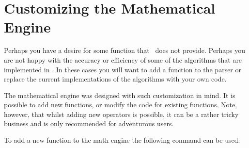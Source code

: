 %
%
%


\section{Customizing the Mathematical Engine}
\label{pgfmath-reimplement}

Perhaps you have a desire for some function that \pgfname\ does not provide.
Perhaps you are not happy with the accuracy or efficiency of some of the
algorithms that are implemented in \pgfname. In these cases you will want to
add a function to the parser or replace the current implementations of the
algorithms with your own code.

The mathematical engine was designed with such customization in mind. It is
possible to add new functions, or modify the code for existing functions. Note,
however, that whilst adding new operators is possible, it can be a rather
tricky business and is only recommended for adventurous users.

To add a new function to the math engine the following command can be used:

